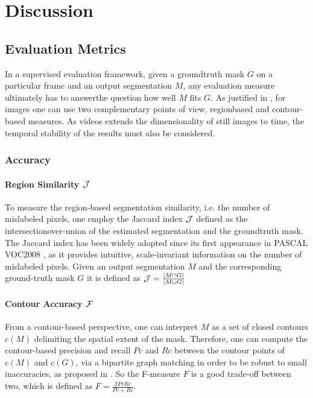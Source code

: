 \section{Discussion}

\subsection{Evaluation Metrics}
In a supervised evaluation framework, given a groundtruth mask $G$ on a particular frame and an output segmentation $M$,
any evaluation measure ultimately has to answerthe question how well $M$ fits $G$. As justified in \cite{pont2016supervised}, 
for images one can use two complementary points of view, regionbased and contour-based measures. As videos extends the
dimensionality of still images to time, the temporal stability of the results must also be considered.

\subsubsection{Accuracy}
\paragraph{Region Similarity $\mathcal{J}$}
To measure the region-based segmentation similarity, i.e. the number of mislabeled pixels,
one employ the Jaccard index $\mathcal{J}$ defined as the intersectionover-union of the estimated segmentation and the groundtruth mask.
The Jaccard index has been widely adopted since its first appearance in PASCAL VOC2008 \cite{martin2004learning}, 
as it provides intuitive, scale-invariant information on the number of mislabeled pixels. Given an output segmentation $M$ and 
the corresponding ground-truth mask $G$ it is defined as $\mathcal{J} = \frac{|M \cap G|}{|M\cup G|}$

\paragraph{Contour Accuracy $\mathcal{F}$}
From a contour-based perspective, one can interpret $M$ as a set of closed contours $c(M)$
delimiting the spatial extent of the mask. Therefore, one
can compute the contour-based precision and recall $Pc$ and
$Rc$ between the contour points of $c(M)$ and $c(G)$, via a bipartite graph matching in order to be robust to small inaccuracies,
as proposed in \cite{martin2004learning}.
So the F-measure $F$ is a good trade-off between two, which is  defined as $F = \frac{2Pc Rc}{Pc+Rc}$.


